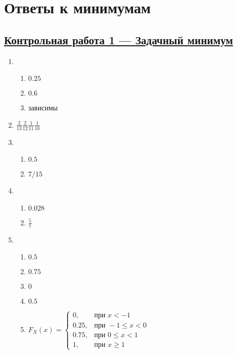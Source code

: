 \thispagestyle{empty}
\section{Ответы к минимумам}

\subsection[Кр 1]{\hyperref[sec:minimum_kr_01]{Контрольная работа 1 — Задачный минимум}}
\label{sec:sol_minimum_kr_01}



\begin{multicols}{2}
\begin{enumerate}
	\item %
	\begin{enumerate}
		\item $0.25$
		\item $0.6$
		\item зависимы
	\end{enumerate}
	\item %
	$\frac{2}{13}\frac{2}{12}\frac{1}{11}\frac{1}{10}$
	\item %
	\begin{enumerate}
		\item $0.5$
		\item $7/15$
	\end{enumerate}	
	\item %
	\begin{enumerate}
		\item $0.028$
		\item $\frac{5}{7}$
	\end{enumerate}	
	\item %
	\begin{enumerate}
		\item $0.5$
		\item $0.75$
		\item $0$
		\item $0.5$
		\item
		$F_{X}(x) = \begin{cases}
		0, & \text{при } x < -1 \\
		0.25 , & \text{при } -1 \le x < 0 \\
		0.75 , & \text{при } 0 \le x < 1 \\
		1, & \text{при }  x \geq 1
		\end{cases}$
\end{enumerate}
\end{enumerate}
\end{multicols}
